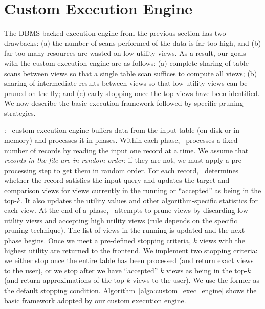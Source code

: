 

\section{Custom Execution Engine}
\label{sec:in_memory_execution_engine}
The DBMS-backed execution engine from the previous section has two drawbacks:
(a) the number of scans performed of the data is far too high, and
(b) far too many resources are wasted on low-utility views.
As a result, our goals with the custom execution engine are as follows:
(a) complete sharing of table scans between views so that a single table scan
suffices to compute all views; 
(b) sharing of intermediate results between views so that low utility views can
be pruned on the fly; and 
(c) early stopping once the top views have been identified. 
We now describe the
basic execution framework followed by specific
pruning strategies.

:
\label{subsec:basic_framework}
\SeeDB\ custom execution engine buffers data from the input table (on disk or in memory) 
and processes it in phases. 
Within each phase, \SeeDB\ processes a fixed number of records by reading the input 
one record at a time.
We assume that {\it records in the file are in random order}; if they are not,
we must apply a pre-processing step to get them in random order.
For each record, \SeeDB\ determines whether the record satisfies the
input query and updates the target and comparison views for views
currently in the running or ``accepted'' as being in the top-$k$.
It also updates the utility values and other algorithm-specific statistics for
each view.
At the end of a phase, \SeeDB\ attempts to prune views by discarding low utility views and
accepting high utility views (rule depends on the specific pruning technique).
The list of views in the running is updated and the next phase begins.
Once we meet a pre-defined stopping criteria, $k$ views with the
highest utility are returned to the frontend.
We implement two stopping criteria: we either stop once the entire table has
been processed (and return exact views to the user), or we stop after
we have ``accepted'' $k$ views as being in the top-$k$ (and return
approximations of the top-$k$ views to the user).
We use the former as the default stopping condition.
Algorithm~\ref{algo:custom_exec_engine} shows the 
basic framework adopted by our custom execution engine.

